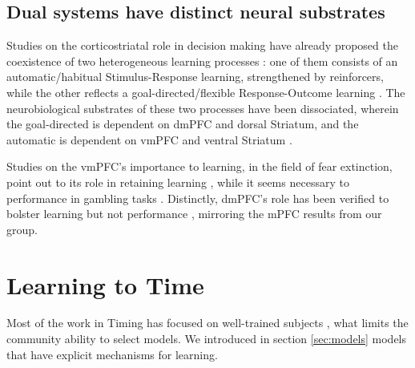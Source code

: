    \subsection{Dual systems have distinct neural substrates}
        Studies on the corticostriatal role in decision making have already proposed the coexistence of two heterogeneous learning processes \cite{balleine1998goal, balleine2007role, smith2013dual}: one of them consists of an automatic/habitual Stimulus-Response learning, strengthened by reinforcers, while the other reflects a goal-directed/flexible Response-Outcome learning \cite{dickinson2015instrumental}. The neurobiological substrates of these two processes have been dissociated, wherein the goal-directed is dependent on dmPFC and dorsal Striatum, and the automatic is dependent on vmPFC and ventral Striatum \cite{dickinson2015instrumental}.

        Studies on the vmPFC's importance to learning, in the field of fear extinction, point out to its role in retaining learning \cite{phelps2004extinction}, while it seems necessary to performance in gambling tasks \cite{rogalsky2012risky}. Distinctly, dmPFC's role has been verified to bolster learning but not performance \cite{balleine2007still}, mirroring the mPFC results from our group.

\section{Learning to Time}
    Most of the work in Timing has focused on well-trained subjects \cite{}, what limits the community ability to select models. We introduced in section \ref{sec:models} models that have explicit mechanisms for learning.
    
